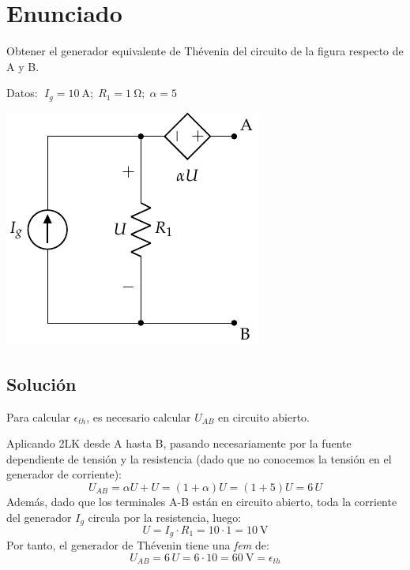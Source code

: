 
\section{Enunciado}
Obtener el generador equivalente de Thévenin del circuito de la figura respecto de A y B.

\vspace{2mm}
Datos: $\; I_g=\qty{10}{\ampere};\; R_1=\qty{1}{\ohm};\; \alpha=5$
\begin{center}
  \includegraphics{figuras/Thevenin1.pdf}
\end{center}

\subsection*{Solución}
Para calcular $\epsilon_{th}$, es necesario calcular $U_{AB}$ en circuito abierto. 

\vspace{2mm}
Aplicando 2LK desde A hasta B, pasando necesariamente por la fuente dependiente de tensión y la resistencia (dado que no conocemos la tensión en el generador de corriente):
\begin{equation*}
  U_{AB} = \alpha U + U = (1 + \alpha) U=(1+5)U=6\,U
\end{equation*}
Además, dado que los terminales A-B están en circuito abierto, toda la corriente del generador $I_g$ circula por la resistencia, luego:
\begin{equation*}
  U = I_g \cdot R_1=10\cdot 1 = \qty{10}{\volt}
\end{equation*}
\vspace{2mm}
Por tanto, el generador de Thévenin tiene una \textit{fem} de:
\begin{equation*}
  U_{AB} = 6\, U = 6\cdot 10 = \boxed{\qty{60}{\volt} = \epsilon_{th}}
\end{equation*}

